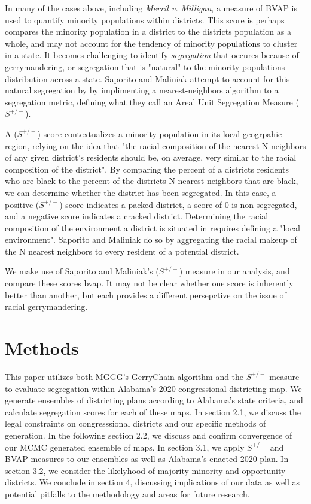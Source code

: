 \documentclass{article}
\begin{document}
In many of the cases above, including \emph{Merril v. Milligan}, a measure of BVAP is used to quantify minority populations within districts. This score is perhaps compares the minority population in a district to the districts population as a whole, and may not account for the tendency of minority populations to cluster in a state. It becomes challenging to identify \emph{segregation} that occures because of gerrymandering, or segregation that is "natural" to the minority populations distribution across a state.
Saporito and Maliniak attempt to account for this natural segregation by by implimenting a nearest-neighbors algorithm to a segregation metric, defining what they call an Areal Unit Segregation Measure ($S^{+/-}$)\cite{SAPORITO2022}.
\par
A ($S^{+/-}$) score contextualizes a minority population in its local geogrpahic region, relying on the idea that "the racial composition of the nearest N neighbors of any given district’s residents should be, on average, very similar to the racial composition of the district"\cite{SAPORITO2022}. By comparing the percent of a districts residents who are black to the percent of the districts N nearest neighbors that are black, we can determine whether the district has been segregated. In this case, a positive ($S^{+/-}$) score indicates a packed district, a score of 0 is non-segregated, and a negative score indicates a cracked district. Determining the racial composition of the environment a district is situated in requires defining a "local environment". Saporito and Maliniak do so by aggregating the racial makeup of the N nearest neighbors to every resident of a potential district.
\par
We make use of Saporito and Maliniak's ($S^{+/-}$) measure in our analysis, and compare these scores bvap. It may not be clear whether one score is inherently better than another, but each provides a different persepctive on the issue of racial gerrymandering.

\section{Methods}\label{methods}
This paper utilizes both MGGG's GerryChain algorithm and the $S^{+/-}$ measure to evaluate segregation within Alabama's 2020 congressional districting map. We generate ensembles of districting plans according to Alabama's state criteria, and calculate segregation scores for each of these maps. In section 2.1, we discuss the legal constraints on congresssional districts and our specific methods of generation. In the following section 2.2, we discuss and confirm convergence of our MCMC generated ensemble of maps. In section 3.1, we apply $S^{+/-}$ and BVAP measures to our ensembles as well as Alabama's enacted 2020 plan. In section 3.2, we consider the likelyhood of majority-minority and opportunity districts. We conclude in section 4, discussing implications of our data as well as potential pitfalls to the methodology and areas for future research.
\end{document}
